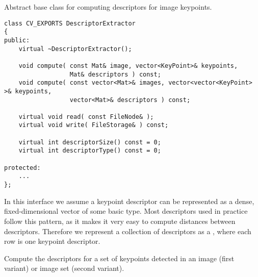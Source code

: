 Abstract base class for computing descriptors for image keypoints.

\begin{lstlisting}
class CV_EXPORTS DescriptorExtractor
{
public:
    virtual ~DescriptorExtractor();

    void compute( const Mat& image, vector<KeyPoint>& keypoints, 
                  Mat& descriptors ) const;
    void compute( const vector<Mat>& images, vector<vector<KeyPoint> >& keypoints, 
                  vector<Mat>& descriptors ) const;

    virtual void read( const FileNode& );
    virtual void write( FileStorage& ) const;

    virtual int descriptorSize() const = 0;
    virtual int descriptorType() const = 0;

protected:
    ...
};
\end{lstlisting}

In this interface we assume a keypoint descriptor can be represented as a
dense, fixed-dimensional vector of some basic type. Most descriptors used
in practice follow this pattern, as it makes it very easy to compute
distances between descriptors. Therefore we represent a collection of
descriptors as a , where each row is one keypoint descriptor.

Compute the descriptors for a set of keypoints detected in an image (first variant) 
or image set (second variant).


\begin{description}
\end{description}


\begin{description}
\end{description}

